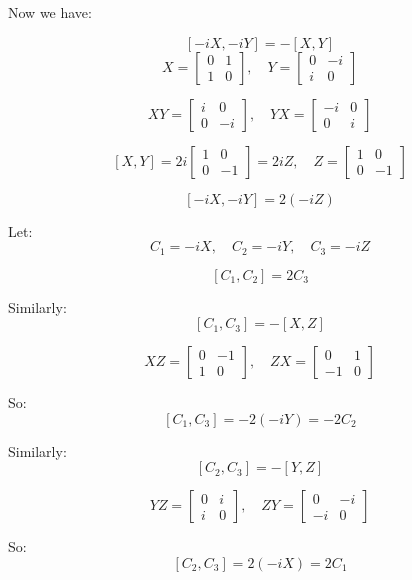 \documentclass{article}
\begin{document}
Now we have:

\[
[-i X, -i Y] = -[X, Y]
\]
\[
X = 
\begin{bmatrix}
0 & 1 \\
1 & 0
\end{bmatrix}, \quad
Y = 
\begin{bmatrix}
0 & -i \\
i & 0
\end{bmatrix}
\]

\[
XY = 
\begin{bmatrix}
i & 0 \\
0 & -i
\end{bmatrix}, \quad
YX = 
\begin{bmatrix}
-i & 0 \\
0 & i
\end{bmatrix}
\]

\[
[X, Y] = 2i 
\begin{bmatrix}
1 & 0 \\
0 & -1
\end{bmatrix} = 2i Z, \quad
Z = 
\begin{bmatrix}
1 & 0 \\
0 & -1
\end{bmatrix}
\]

\[
[-i X, -i Y] = 2 (-i Z)
\]

Let:
\[
C_1 = -i X, \quad C_2 = -i Y, \quad C_3 = -i Z
\]

\[
[C_1, C_2] = 2 C_3
\]

Similarly:
\[
[C_1, C_3] = -[X, Z]
\]

\[
XZ = 
\begin{bmatrix}
0 & -1 \\
1 & 0
\end{bmatrix}, \quad
ZX = 
\begin{bmatrix}
0 & 1 \\
-1 & 0
\end{bmatrix}
\]

So:
\[
[C_1, C_3] = -2 (-i Y) = -2 C_2
\]

Similarly:
\[
[C_2, C_3] = -[Y, Z]
\]

\[
YZ = 
\begin{bmatrix}
0 & i \\
i & 0
\end{bmatrix}, \quad
ZY = 
\begin{bmatrix}
0 & -i \\
-i & 0
\end{bmatrix}
\]

So:
\[
[C_2, C_3] = 2(-i X) = 2 C_1
\]
\end{document}

